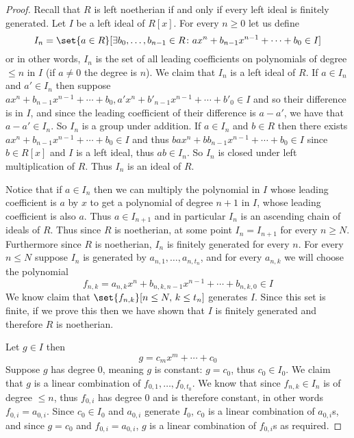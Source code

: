 \documentclass[10pt]{article}
\begin{document}
\begin{proof}

    Recall that $R$ is left noetherian if and only if every left ideal is finitely generated.
    Let $I$ be a left ideal of $R[x]$.
    For every $n\geq0$ let us define
    \[ I_n = \set{a\in R}[\exists b_0,\dots,b_{n-1}\in R\colon ax^n+b_{n-1}x^{n-1}+\cdots+b_0\in I] \]
    or in other words, $I_n$ is the set of all leading coefficients on polynomials of degree $\leq n$ in $I$ (if $a\neq0$ the degree is $n$).
    We claim that $I_n$ is a left ideal of $R$.
    If $a\in I_n$ and $a'\in I_n$ then suppose $ax^n+b_{n-1}x^{n-1}+\cdots+b_0,a'x^n+b'_{n-1}x^{n-1}+\cdots+b'_0\in I$ and so their difference is in $I$, and since the leading coefficient of their difference
    is $a-a'$, we have that $a-a'\in I_n$.
    So $I_n$ is a group under addition.
    If $a\in I_n$ and $b\in R$ then there exists $ax^n+b_{n-1}x^{n-1}+\cdots+b_0\in I$ and thus $bax^n+bb_{n-1}x^{n-1}+\cdots+b_0\in I$ since $b\in R[x]$ and $I$ is a left ideal, thus $ab\in I_n$.
    So $I_n$ is closed under left multiplication of $R$.
    Thus $I_n$ is an ideal of $R$.

    Notice that if $a\in I_n$ then we can multiply the polynomial in $I$ whose leading coefficient is $a$ by $x$ to get a polynomial of degree $n+1$ in $I$, whose leading coefficient is also $a$.
    Thus $a\in I_{n+1}$ and in particular $I_n$ is an ascending chain of ideals of $R$.
    Thus since $R$ is noetherian, at some point $I_n=I_{n+1}$ for every $n\geq N$.
    Furthermore since $R$ is noetherian, $I_n$ is finitely generated for every $n$.
    For every $n\leq N$ suppose $I_n$ is generated by $a_{n,1},\dots,a_{n,t_n}$, and for every $a_{n,k}$ we will choose the polynomial
    \[ f_{n,k} = a_{n,k}x^n + b_{n,k,n-1}x^{n-1} + \cdots + b_{n,k,0} \in I \]
    We know claim that $\set{f_{n,k}}[n\leq N,\, k\leq t_n]$ generates $I$.
    Since this set is finite, if we prove this then we have shown that $I$ is finitely generated and therefore $R$ is noetherian.

    Let $g\in I$ then
    \[ g = c_mx^m + \cdots + c_0 \]
    Suppose $g$ has degree $0$, meaning $g$ is constant: $g=c_0$, thus $c_0\in I_0$.
    We claim that $g$ is a linear combination of $f_{0,1},\dots,f_{0,t_0}$.
    We know that since $f_{n,k}\in I_n$ is of degree $\leq n$, thus $f_{0,i}$ has degree $0$ and is therefore constant, in other words $f_{0,i}=a_{0,i}$.
    Since $c_0\in I_0$ and $a_{0,i}$ generate $I_0$, $c_0$ is a linear combination of $a_{0,i}$s, and since $g=c_0$ and $f_{0,i}=a_{0,i}$, $g$ is a linear combination of $f_{0,i}$s as required.


\end{proof}
\end{document}
